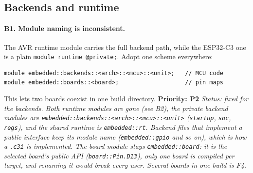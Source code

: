 \documentclass[11pt,a4paper]{article}
\newcommand{\pkg}[1]{\texttt{#1}}
\newcommand{\prio}[1]{\textbf{Priority: #1}}
\begin{document}
\subsection{Backends and runtime}

\paragraph{B1. Module naming is inconsistent.}
The AVR runtime module carries the full backend path, while the ESP32-C3 one is a plain
\pkg{module runtime @private;}. Adopt one scheme everywhere:

\begin{lstlisting}[language=C3]
module embedded::backends::<arch>::<mcu>::<unit>;   // MCU code
module embedded::boards::<board>;                   // pin maps
\end{lstlisting}
\noindent
This lets two boards coexist in one build directory. \prio{P2}
\textit{Status: fixed for the backends. Both runtime modules are gone (see B2), the private backend modules are \pkg{embedded::backends::<arch>::<mcu>::<unit>} (\pkg{startup}, \pkg{soc}, \pkg{regs}), and the shared runtime is \pkg{embedded::rt}. Backend files that implement a public interface keep its module name (\pkg{embedded::gpio} and so on), which is how a \pkg{.c3i} is implemented. The board module stays \pkg{embedded::board}: it is the selected board's public API (\pkg{board::Pin.D13}), only one board is compiled per target, and renaming it would break every user. Several boards in one build is F4.}
\end{document}

